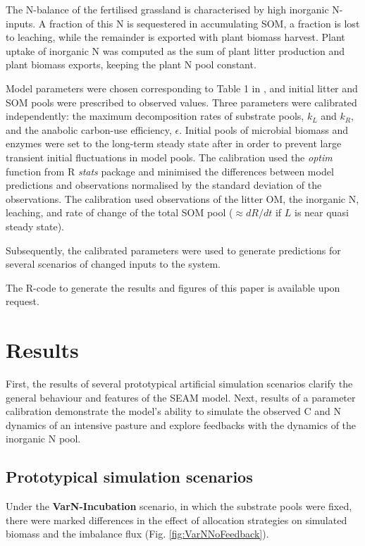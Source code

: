 The N-balance of the fertilised grassland is characterised by high inorganic
N-inputs. A fraction of this N is sequestered in accumulating SOM, a fraction is
lost to leaching, while the remainder is exported with plant biomass harvest.
Plant uptake of inorganic N was computed as the sum of plant litter production
and plant biomass exports, keeping the plant N pool constant.
 
Model parameters were chosen corresponding to Table 1 in \citet{Perveen14}, and
initial litter and SOM pools were prescribed to observed values.
Three parameters were calibrated independently: the maximum decomposition rates
of substrate pools, $k_L$ and $k_R$, and the anabolic carbon-use efficiency,
$\epsilon$. Initial pools of microbial biomass and enzymes were set to the
long-term steady state after in order to prevent large transient initial
fluctuations in model pools. The calibration used the \textit{optim} function
from R \textit{stats} package \citep{R07} and minimised the differences between model
predictions and observations normalised by the standard deviation of the
observations. The calibration used observations of the litter OM, the inorganic
N, leaching, and rate of change of the total SOM pool ($\approx dR/dt$ if $L$ is
near quasi steady state). 

Subsequently, the calibrated parameters were used to generate
predictions for several scenarios of changed inputs to the system.

The R-code to generate the results and figures of this paper is available upon
request. 
 
\section{Results}

First, the results of several prototypical artificial simulation scenarios
clarify the general behaviour and features of the SEAM model. Next, results of a
parameter calibration demonstrate the model's ability to
simulate the observed C and N dynamics of an intensive pasture and explore
feedbacks with the dynamics of the inorganic N pool.

\subsection{Prototypical simulation scenarios}
\label{sec:ResultsProto}

Under the \textbf{VarN-Incubation} scenario, in which the substrate pools were fixed,
there were marked differences in the effect of allocation strategies on simulated biomass and the imbalance flux (Fig.
\ref{fig:VarNNoFeedback}).
 
